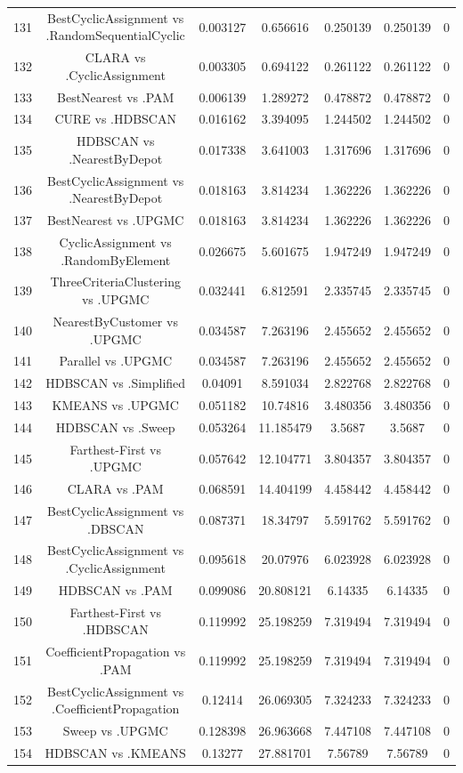 \documentclass[a4paper,10pt]{article}
\begin{document}
\begin{landscape}
\begin{table}[!htp]
\begin{tabular}{ccccccc}
131&BestCyclicAssignment vs .RandomSequentialCyclic&0.003127&0.656616&0.250139&0.250139&0\\
132&CLARA vs .CyclicAssignment&0.003305&0.694122&0.261122&0.261122&0\\
133&BestNearest vs .PAM&0.006139&1.289272&0.478872&0.478872&0\\
134&CURE vs .HDBSCAN&0.016162&3.394095&1.244502&1.244502&0\\
135&HDBSCAN vs .NearestByDepot&0.017338&3.641003&1.317696&1.317696&0\\
136&BestCyclicAssignment vs .NearestByDepot&0.018163&3.814234&1.362226&1.362226&0\\
137&BestNearest vs .UPGMC&0.018163&3.814234&1.362226&1.362226&0\\
138&CyclicAssignment vs .RandomByElement&0.026675&5.601675&1.947249&1.947249&0\\
139&ThreeCriteriaClustering vs .UPGMC&0.032441&6.812591&2.335745&2.335745&0\\
140&NearestByCustomer vs .UPGMC&0.034587&7.263196&2.455652&2.455652&0\\
141&Parallel vs .UPGMC&0.034587&7.263196&2.455652&2.455652&0\\
142&HDBSCAN vs .Simplified&0.04091&8.591034&2.822768&2.822768&0\\
143&KMEANS vs .UPGMC&0.051182&10.74816&3.480356&3.480356&0\\
144&HDBSCAN vs .Sweep&0.053264&11.185479&3.5687&3.5687&0\\
145&Farthest-First vs .UPGMC&0.057642&12.104771&3.804357&3.804357&0\\
146&CLARA vs .PAM&0.068591&14.404199&4.458442&4.458442&0\\
147&BestCyclicAssignment vs .DBSCAN&0.087371&18.34797&5.591762&5.591762&0\\
148&BestCyclicAssignment vs .CyclicAssignment&0.095618&20.07976&6.023928&6.023928&0\\
149&HDBSCAN vs .PAM&0.099086&20.808121&6.14335&6.14335&0\\
150&Farthest-First vs .HDBSCAN&0.119992&25.198259&7.319494&7.319494&0\\
151&CoefficientPropagation vs .PAM&0.119992&25.198259&7.319494&7.319494&0\\
152&BestCyclicAssignment vs .CoefficientPropagation&0.12414&26.069305&7.324233&7.324233&0\\
153&Sweep vs .UPGMC&0.128398&26.963668&7.447108&7.447108&0\\
154&HDBSCAN vs .KMEANS&0.13277&27.881701&7.56789&7.56789&0\\

\end{tabular}
\end{table}
\end{landscape}
\end{document}
